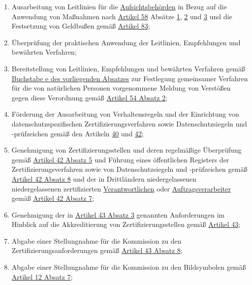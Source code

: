 \begin{enumerate}
\begin{enumerate}
    \item Ausarbeitung von Leitlinien für die \hyperref[itm:04-21]{Aufsichtsbehörden} in Bezug auf die Anwendung von
     Maßnahmen nach \hyperref[ch:58]{Artikel 58} Absätze \hyperref[itm:58-1]{1}, \hyperref[itm:58-2]{2} und \hyperref
     [itm:58-3]{3} und die Festsetzung von Geldbußen gemäß \hyperref[ch:83]{Artikel 83};%
    \label{itm:70-1k}

    \item Überprüfung der praktischen Anwendung der Leitlinien, Empfehlungen und bewährten Verfahren;%
    \label{itm:70-1l}

    \item Bereitstellung von Leitlinien, Empfehlungen und bewährten Verfahren gemäß \hyperref[itm:70-1e]{Buchstabe e des
     vorliegenden Absatzes} zur Festlegung gemeinsamer Verfahren für die von natürlichen Personen vorgenommene Meldung
     von Verstößen gegen diese Verordnung gemäß \hyperref[itm:54-2]{Artikel 54 Absatz 2};%
    \label{itm:70-1m}

    \item Förderung der Ausarbeitung von Verhaltensregeln und der Einrichtung von datenschutzspezifischen
     Zertifizierungsverfahren sowie Datenschutzsiegeln und -prüfzeichen gemäß den Artikeln \hyperref[ch:40]{40} und
     \hyperref[ch:42]{42};%
    \label{itm:70-1n}

    \item Genehmigung von Zertifizierungsstellen und deren regelmäßige Überprüfung gemäß \hyperref[itm:42-5]{Artikel 42
     Absatz 5} und Führung eines öffentlichen Registers der Zertifizierungsverfahren sowie von Datenschutzsiegeln und
     -prüfzeichen gemäß \hyperref[itm:42-8]{Artikel 42 Absatz 8} und der in Drittländern niedergelassenen
      niedergelassenen zertifizierten \hyperref[itm:04-7]{Verantwortlichen} oder \hyperref[itm:04-8]
      {Auftragsverarbeiter} gemäß \hyperref[itm:42-7]{Artikel 42 Absatz 7};%
    \label{itm:70-1o}

    \item Genehmigung der in \hyperref[itm:43-3]{Artikel 43 Absatz 3} genannten Anforderungen im Hinblick auf die
     Akkreditierung von Zertifizierungsstellen gemäß \hyperref[ch:43]{Artikel 43};%
    \label{itm:70-1p}

    \item Abgabe einer Stellungnahme für die Kommission zu den Zertifizierungsanforderungen gemäß \hyperref[itm:43-8]
     {Artikel 43 Absatz 8};%
    \label{itm:70-1q}

    \item Abgabe einer Stellungnahme für die Kommission zu den Bildsymbolen gemäß \hyperref[itm:12-7]{Artikel 12 Absatz
     7};%
    \label{itm:70-1r}


\end{enumerate}
\end{enumerate}
